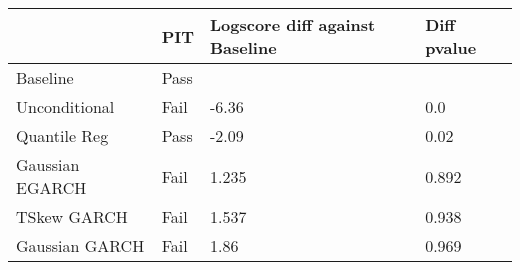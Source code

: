 \begin{tabular}{llll}
\toprule
{} &   PIT & Logscore diff against Baseline & Diff pvalue \\
\midrule
Baseline        &  Pass &                                &             \\
Unconditional   &  Fail &                          -6.36 &         0.0 \\
Quantile Reg    &  Pass &                          -2.09 &        0.02 \\
Gaussian EGARCH &  Fail &                          1.235 &       0.892 \\
TSkew GARCH     &  Fail &                          1.537 &       0.938 \\
Gaussian GARCH  &  Fail &                           1.86 &       0.969 \\
\bottomrule
\end{tabular}

